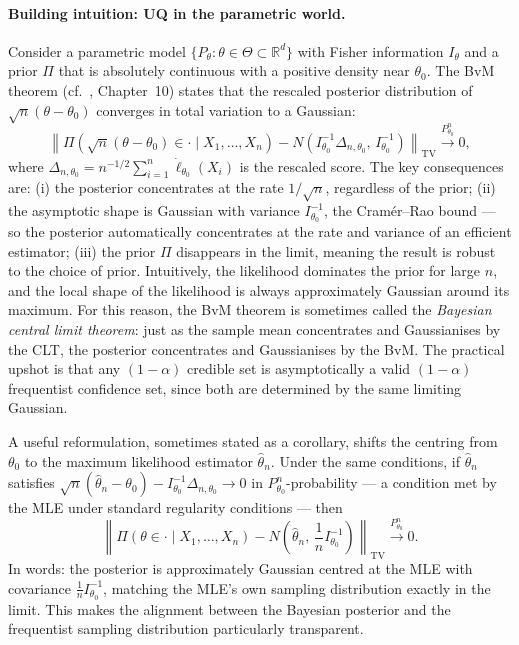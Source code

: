 \paragraph{Building intuition: UQ in the parametric world.} Consider a parametric model $\{P_\theta : \theta \in \Theta \subset \mathbb{R}^d\}$ with Fisher information $I_\theta$ and a prior $\Pi$ that is absolutely continuous with a positive density near $\theta_0$. The BvM theorem (cf.\ \cite{6}, Chapter~10) states that the rescaled posterior distribution of $\sqrt{n}(\theta - \theta_0)$ converges in total variation to a Gaussian:
\[
\left\|\Pi\!\left(\sqrt{n}(\theta - \theta_0) \in \cdot \mid X_1,\ldots,X_n\right) - N\!\left(I_{\theta_0}^{-1}\Delta_{n,\theta_0},\, I_{\theta_0}^{-1}\right)\right\|_{\mathrm{TV}} \xrightarrow{P_{\theta_0}^n} 0,
\]
where $\Delta_{n,\theta_0} = n^{-1/2}\sum_{i=1}^n \dot\ell_{\theta_0}(X_i)$ is the rescaled score. The key consequences are: (i) the posterior concentrates at the rate $1/\sqrt{n}$, regardless of the prior; (ii) the asymptotic shape is Gaussian with variance $I_{\theta_0}^{-1}$, the Cramér--Rao bound --- so the posterior automatically concentrates at the rate and variance of an efficient estimator; (iii) the prior $\Pi$ disappears in the limit, meaning the result is robust to the choice of prior. Intuitively, the likelihood dominates the prior for large $n$, and the local shape of the likelihood is always approximately Gaussian around its maximum. For this reason, the BvM theorem is sometimes called the \textit{Bayesian central limit theorem}: just as the sample mean concentrates and Gaussianises by the CLT, the posterior concentrates and Gaussianises by the BvM. The practical upshot is that any $(1-\alpha)$ credible set is asymptotically a valid $(1-\alpha)$ frequentist confidence set, since both are determined by the same limiting Gaussian.

A useful reformulation, sometimes stated as a corollary, shifts the centring from $\theta_0$ to the maximum likelihood estimator $\hat\theta_n$. Under the same conditions, if $\hat\theta_n$ satisfies $\sqrt{n}(\hat\theta_n-\theta_0) - I_{\theta_0}^{-1}\Delta_{n,\theta_0} \to 0$ in $P_{\theta_0}^n$-probability --- a condition met by the MLE under standard regularity conditions --- then
\[
\left\|\Pi\!\left(\theta \in \cdot \mid X_1,\ldots,X_n\right) - N\!\left(\hat\theta_n,\, \frac{1}{n}I_{\theta_0}^{-1}\right)\right\|_{\mathrm{TV}} \xrightarrow{P_{\theta_0}^n} 0.
\]
In words: the posterior is approximately Gaussian centred at the MLE with covariance $\frac{1}{n}I_{\theta_0}^{-1}$, matching the MLE's own sampling distribution exactly in the limit. This makes the alignment between the Bayesian posterior and the frequentist sampling distribution particularly transparent.

